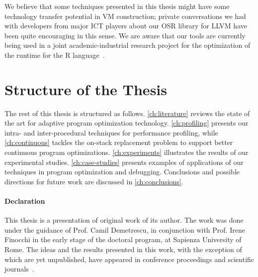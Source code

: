 We believe that some techniques presented in this thesis might have some technology transfer potential in VM construction; private conversations we had with developers from major ICT players about our OSR library for LLVM have been quite encouraging in this sense. We are aware that our tools are currently being used in a joint academic-industrial research project for the optimization of the runtime for the R language~\cite{vitek16}.

\section{Structure of the Thesis}

The rest of this thesis is structured as follows. \mychapter\ref{ch:literature} reviews the state of the art for adaptive program optimization technology. \mychapter\ref{ch:profiling} presents our intra- and inter-procedural techniques for performance profiling, while \mychapter\ref {ch:continuous} tackles the on-stack replacement problem to support better continuous program optimizations. \mychapter\ref{ch:experiments} illustrates the results of our experimental studies. \mychapter\ref{ch:case-studies} presents examples of applications of our techniques in program optimization and debugging. Conclusions and possible directions for future work are discussed in \mychapter\ref{ch:conclusions}.

\paragraph*{Declaration} This thesis is a presentation of original work of its author. The work was done under the guidance of Prof. Camil Demetrescu, in conjunction with Prof. Irene Finocchi in the early stage of the doctoral program, at Sapienza University of Rome. The ideas and the results presented in this work, with the exception of  which are yet unpublished, have appeared in conference proceedings and scientific journals~\cite{Delia11,Delia13,Delia15,Delia16}.

